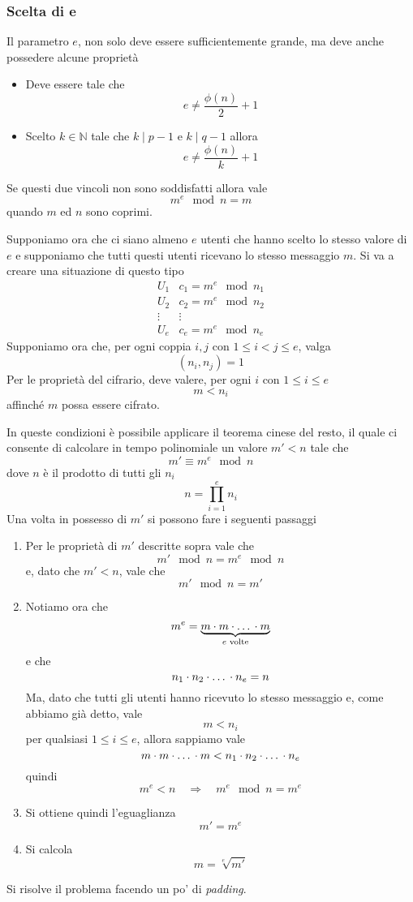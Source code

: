 \subsubsection{Scelta di e}
Il parametro $e$, non solo deve essere sufficientemente grande, ma deve anche possedere alcune propriet\`a
\begin{itemize}
	\item Deve essere tale che
	      \[ e \neq \frac{\phi(n)}{2} + 1 \]
	\item Scelto $k \in \mathbb{N}$ tale che $k \mid p-1$ e $k \mid q-1$ allora
	      \[ e \neq \frac{\phi(n)}{k} + 1 \]
\end{itemize}
Se questi due vincoli non sono soddisfatti allora vale
\[ m^e \mod{n} = m \]
quando $m$ ed $n$ sono coprimi.

Supponiamo ora che ci siano almeno $e$ utenti che hanno scelto lo stesso valore di $e$ e supponiamo che tutti questi
utenti ricevano lo stesso messaggio $m$. Si va a creare una situazione di questo tipo
\[
	\begin{matrix}
		U_1    & c_1 = m^e \mod{n_1} \\
		U_2    & c_2 = m^e \mod{n_2} \\
		\vdots & \vdots              \\
		U_e    & c_e = m^e \mod{n_e}
	\end{matrix}
\]
Supponiamo ora che, per ogni coppia $i, j$ con $1 \leq i < j \leq e$, valga
\[ (n_i, n_j) = 1 \]
Per le propriet\`a del cifrario, deve valere, per ogni $i$ con $1 \leq i \leq e$
\[ m < n_i \]
affinch\'e $m$ possa essere cifrato.

In queste condizioni \`e possibile applicare il teorema cinese del resto, il quale ci consente di calcolare in
tempo polinomiale un valore $m' < n$ tale che
\[ m' \equiv m^e \mod{n} \]
dove $n$ \`e il prodotto di tutti gli $n_i$
\[ n = \prod_{i=1}^e n_i \]
Una volta in possesso di $m'$ si possono fare i seguenti passaggi
\begin{enumerate}
	\item Per le propriet\`a di $m'$ descritte sopra vale che
	      \[ m' \mod{n} = m^e \mod{n} \]
	      e, dato che $m' < n$, vale che
	      \[ m' \mod{n} = m' \]
	\item Notiamo ora che
	      \[ m^e = \underbrace{m \cdot m \cdot \text{\dots} \cdot m}_{e \text{ volte}} \]
	      e che
	      \[ n_1 \cdot n_2 \cdot \text{\dots} \cdot n_e = n \]
	      Ma, dato che tutti gli utenti hanno ricevuto lo stesso messaggio e, come abbiamo gi\`a detto, vale
	      \[ m < n_i \]
	      per qualsiasi $1 \leq i \leq e$, allora sappiamo vale
	      \[ m \cdot m \cdot \text{\dots} \cdot m < n_1 \cdot n_2 \cdot \text{\dots} \cdot n_e \]
	      quindi
	      \[ m^e < n \quad \Rightarrow \quad m^e \mod{n} = m^e \]
	\item Si ottiene quindi l'eguaglianza
	      \[ m' = m^e \]
	\item Si calcola
	      \[ m = \sqrt[e]{m'} \]
\end{enumerate}
Si risolve il problema facendo un po' di \emph{padding}.

